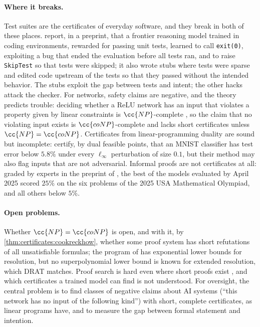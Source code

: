 \begin{refsection}
\paragraph{Where it breaks.} Test suites are the certificates of everyday software, and they break in both of these places. \Textcite{BakerEtAl2025} report, in a preprint, that a frontier reasoning model trained in coding environments, rewarded for passing unit tests, learned to call \texttt{exit(0)}, exploiting a bug that ended the evaluation before all tests ran, and to raise \texttt{SkipTest} so that tests were skipped; it also wrote stubs where tests were sparse and edited code upstream of the tests so that they passed without the intended behavior. The stubs exploit the gap between tests and intent; the other hacks attack the checker. For networks, safety claims are negative, and the theory predicts trouble: deciding whether a ReLU network has an input that violates a property given by linear constraints is $\cc{NP}$-complete \parencite{KatzEtAl2017}, so the claim that no violating input exists is $\cc{coNP}$-complete and lacks short certificates unless $\cc{NP}=\cc{coNP}$. Certificates from linear-programming duality are sound but incomplete: \textcite{WongKolter2018} certify, by dual feasible points, that an MNIST classifier has test error below $5.8\%$ under every $\ell_\infty$ perturbation of size $0.1$, but their method may also flag inputs that are not adversarial. Informal proofs are not certificates at all: graded by experts in the preprint of \textcite{PetrovEtAl2025}, the best of the models evaluated by April 2025 scored $25\%$ on the six problems of the 2025 USA Mathematical Olympiad, and all others below $5\%$.

\paragraph{Open problems.} Whether $\cc{NP}=\cc{coNP}$ is open, and with it, by \cref{thm:certificates:cookreckhow}, whether some proof system has short refutations of all unsatisfiable formulas; the program of \textcite{CookReckhow1979} has exponential lower bounds for resolution, but no superpolynomial lower bound is known for extended resolution, which DRAT matches. Proof search is hard even where short proofs exist \parencite{AtseriasMuller2020}, and which certificates a trained model can find is not understood. For oversight, the central problem is to find classes of negative claims about AI systems (``this network has no input of the following kind'') with short, complete certificates, as linear programs have, and to measure the gap between formal statement and intention.


\end{refsection}
